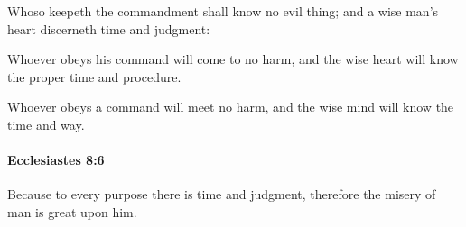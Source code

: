 			\begin{versebox}
					\item[BHS] 
					\item[LXX] 
					\item[ASV] Whoso keepeth the commandment shall know no evil thing; and a wise man's heart discerneth time and judgment:
					\item[NIV] Whoever obeys his command will come to no harm, and the wise heart will know the proper time and procedure.
					\item[NRSV] Whoever obeys a command will meet no harm, and the wise mind will know the time and way.
			\end{versebox}

		\paragraph{Ecclesiastes 8:6} %
			\label{ECCLESIASTES-8-6}

			Because to every purpose there is time and judgment, therefore the misery of man is great upon him.

